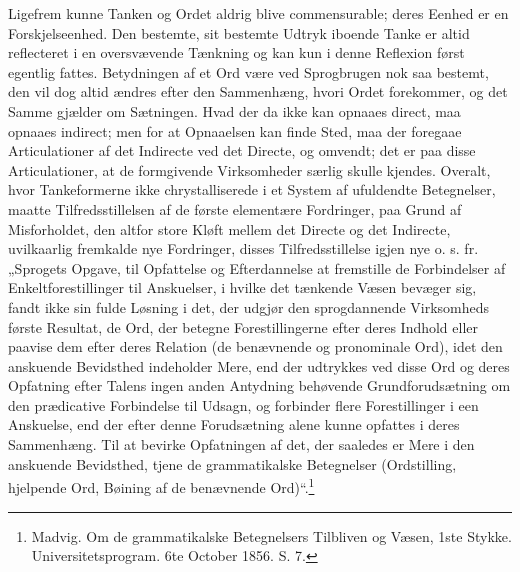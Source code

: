 \documentclass[12pt]{book}
\newcommand{\opage}[1]{\marginnote{\footnotesize\textit{[#1]}}}
\begin{document}
Ligefrem kunne Tanken og Ordet aldrig blive commensurable;
deres Eenhed er en Forskjelseenhed. Den bestemte,
sit bestemte Udtryk iboende Tanke er altid reflecteret i en oversvævende
Tænkning og kan kun i denne Reflexion først egentlig
fattes. Betydningen af et Ord være ved Sprogbrugen nok saa
bestemt, den vil dog altid ændres efter den Sammenhæng,
hvori Ordet forekommer, og det Samme gjælder om Sætningen.
Hvad der da ikke kan opnaaes direct, maa opnaaes
\opage{37}indirect; men for at Opnaaelsen kan finde Sted, maa der
foregaae Articulationer af det Indirecte ved det Directe, og
omvendt; det er paa disse Articulationer, at de formgivende
Virksomheder særlig skulle kjendes. Overalt, hvor
Tankeformerne ikke chrystalliserede i et System af ufuldendte Betegnelser,
maatte Tilfredsstillelsen af de første elementære Fordringer,
paa Grund af Misforholdet, den altfor store Kløft mellem
det Directe og det Indirecte, uvilkaarlig fremkalde nye
Fordringer, disses Tilfredsstillelse igjen nye o. s. fr. „Sprogets
Opgave, til Opfattelse og Efterdannelse at fremstille de
Forbindelser af Enkeltforestillinger til Anskuelser, i hvilke det
tænkende Væsen bevæger sig, fandt ikke sin fulde Løsning i det,
der udgjør den sprogdannende Virksomheds første Resultat, de
Ord, der betegne Forestillingerne efter deres Indhold eller
paavise dem efter deres Relation (de benævnende og
pronominale Ord), idet den anskuende Bevidsthed indeholder Mere,
end der udtrykkes ved disse Ord og deres Opfatning efter
Talens ingen anden Antydning behøvende Grundforudsætning
om den prædicative Forbindelse til Udsagn, og forbinder flere
Forestillinger i een Anskuelse, end der efter denne Forudsætning
alene kunne opfattes i deres Sammenhæng. Til at bevirke
Opfatningen af det, der saaledes er Mere i den anskuende
Bevidsthed, tjene de grammatikalske Betegnelser (Ordstilling,
hjelpende Ord, Bøining af de benævnende Ord)“.\footnote{%
Madvig. Om de grammatikalske Betegnelsers Tilbliven og Væsen,
1ste Stykke. Universitetsprogram. 6te October 1856. S. 7.}
\end{document}
